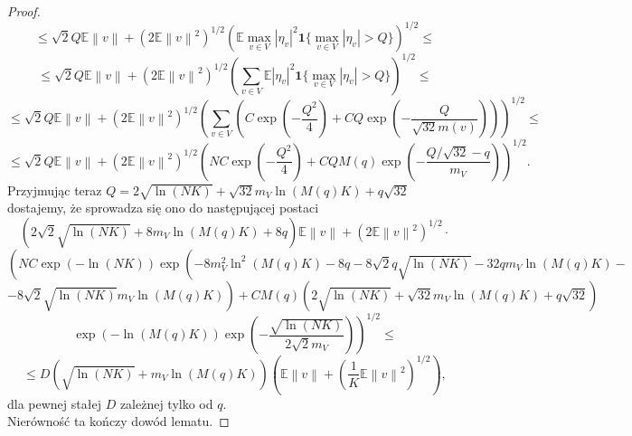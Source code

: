 \documentclass{article}
\newcommand{\norm}[1]{\left\lVert#1\right\rVert}
\begin{document}
\begin{proof}
\begin{displaymath}
\end{displaymath}
\begin{displaymath}
\leq \sqrt{2}Q\mathbb{E}\norm{v}+\left(2\mathbb{E}\norm{v}^2\right)^{1/2}\left(\mathbb{E}\max_{v\in V}|\eta_v|^2\pmb{1}\{\max_{v\in V}|\eta_v|> Q\}\right)^{1/2}\leq
\end{displaymath}
\begin{displaymath}
\leq \sqrt{2}Q\mathbb{E}\norm{v}+\left(2\mathbb{E}\norm{v}^2\right)^{1/2}\left(\sum_{v\in V}\mathbb{E}|\eta_v|^2\pmb{1}\{\max_{v\in V}|\eta_v|> Q\}\right)^{1/2}\leq
\end{displaymath}
\begin{displaymath}
\leq \sqrt{2}Q\mathbb{E}\norm{v}+\left(2\mathbb{E}\norm{v}^2\right)^{1/2}\left(\sum_{v\in V}\left(C\exp\left(-\frac{Q^2}{4}\right)+CQ\exp \left(-\frac{Q}{\sqrt{32}m(v)}\right)\right)\right)^{1/2}\leq 
\end{displaymath}
\begin{displaymath}
\leq \sqrt{2}Q\mathbb{E}\norm{v}+\left(2\mathbb{E}\norm{v}^2\right)^{1/2}\left(NC\exp\left(-\frac{Q^2}{4}\right)+CQM(q)\exp \left(-\frac{Q/\sqrt{32}-q}{m_V}\right)\right)^{1/2}.
\end{displaymath}
Przyjmując teraz $Q=2\sqrt{\ln (NK)}+\sqrt{32}m_V\ln (M(q)K)+q\sqrt{32}$ dostajemy, że sprowadza się ono do następującej postaci
\begin{displaymath}
\left(2\sqrt{2}\sqrt{\ln (NK)}+8m_V\ln (M(q)K)+8q\right)\mathbb{E}\norm{v}+\left(2\mathbb{E}\norm{v}^2\right)^{1/2}\cdot
\end{displaymath}
\begin{displaymath}
\left(NC\exp\left(-\ln (NK)\right)\exp\left(-8m^2_V\ln^2 (M(q)K)-8q-8\sqrt{2}q\sqrt{\ln (NK)}-32qm_V\ln (M(q)K)-\right.\right.
\end{displaymath}
\begin{displaymath}
\left.\left.-8\sqrt{2}\sqrt{\ln (NK)}m_V\ln (M(q)K)\right)+CM(q)\left(2\sqrt{\ln (NK)}+\sqrt{32}m_V\ln (M(q)K)+q\sqrt{32}\right)\right.
\end{displaymath}
\begin{displaymath}
\left. \exp\left(-\ln (M(q)K)\right)\exp \left(-\frac{\sqrt{\ln (NK)}}{2\sqrt{2}m_V}\right)\right)^{1/2}\leq
\end{displaymath}
\begin{displaymath}
\leq D\left(\sqrt{\ln (NK)}+m_V\ln (M(q)K)\right)\left(\mathbb{E}\norm{v}+\left(\frac{1}{K}\mathbb{E}\norm{v}^2\right)^{1/2}\right),
\end{displaymath}
dla pewnej stałej $D$ zależnej tylko od $q$.\\
Nierówność ta kończy dowód lematu.
\end{proof}
\end{document}
